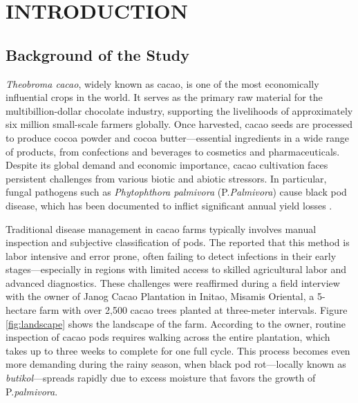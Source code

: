 \chapter{INTRODUCTION}

{\baselineskip

	\section{Background of the Study}
\textit{Theobroma cacao}, widely known as cacao, is one of the most economically influential crops in the world. It serves as the primary raw material for the multibillion-dollar chocolate industry, supporting the livelihoods of approximately six million small-scale farmers globally. Once harvested, cacao seeds are processed to produce cocoa powder and cocoa butter—essential ingredients in a wide range of products, from confections and beverages to cosmetics and pharmaceuticals. Despite its global demand and economic importance, cacao cultivation faces persistent challenges from various biotic and abiotic stressors. In particular, fungal pathogens such as \textit{Phytophthora palmivora} (P.\textit{Palmivora}) cause black pod disease, which has been documented to inflict significant annual yield losses \cite{Avila2023}.

Traditional disease management in cacao farms typically involves manual inspection and subjective classification of pods. The \cite{PhilCacaoRoadmap2021} reported that this method is labor intensive and error prone, often failing to detect infections in their early stages—especially in regions with limited access to skilled agricultural labor and advanced diagnostics. These challenges were reaffirmed during a field interview with the owner of Janog Cacao Plantation in Initao, Misamis Oriental, a 5-hectare farm with over 2,500 cacao trees planted at three-meter intervals. Figure \ref{fig:landscape} shows the landscape of the farm. According to the owner, routine inspection of cacao pods requires walking across the entire plantation, which takes up to three weeks to complete for one full cycle. This process becomes even more demanding during the rainy season, when black pod rot—locally known as \textit{butikol}—spreads rapidly due to excess moisture that favors the growth of P.\textit{palmivora}.

}
